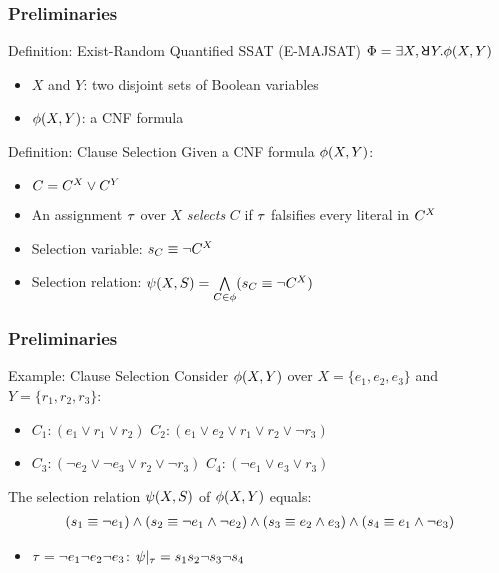 \begin{frame}
    \frametitle{Preliminaries}
    \begin{block}{Definition: Exist-Random Quantified SSAT (E-MAJSAT)}
        $\Qf=\exists X,\random{} Y.\pf(X,Y)$
        \pause
        \begin{itemize}
            \item $X$ and $Y$: two disjoint sets of Boolean variables
                  \pause
            \item $\phi(X,Y)$: a CNF formula
                  \pause
        \end{itemize}
    \end{block}
    \begin{block}{Definition: Clause Selection}
        Given a CNF formula $\phi(X,Y)$:
        \pause
        \begin{itemize}
            \item $C=C^X\lor C^Y$
                  \pause
            \item An assignment $\tau$ over $X$ \textit{selects} $C$ if $\tau$ falsifies every literal in $C^X$
                  \pause
            \item Selection variable: $s_{C}\equiv\lnot C^X$
                  \pause
            \item Selection relation: $\psi(X,S)=\bigwedge\limits_{C\in\phi}(s_{C}\equiv\lnot C^X)$
        \end{itemize}
    \end{block}
\end{frame}

\begin{frame}
    \frametitle{Preliminaries}
    \begin{block}{Example: Clause Selection}
        Consider $\phi(X,Y)$ over $X=\{e_1,e_2,e_3\}$ and $Y=\{r_1,r_2,r_3\}$:
        \begin{itemize}
            \item[] $C_1: (e_1 \lor r_1 \lor r_2)$ $C_2: (e_1 \lor e_2 \lor r_1 \lor r_2 \lor \lnot r_3)$
            \item[] $C_3: (\lnot e_2 \lor \lnot e_3 \lor r_2 \lor \lnot r_3)$ $C_4: (\lnot e_1 \lor e_3 \lor r_3)$
        \end{itemize}
        \pause
        The selection relation $\psi(X,S)$ of $\phi(X,Y)$ equals:
        \belowdisplayskip=0pt
        \begin{align*}
            (s_{1} \equiv \lnot e_1) \land
            (s_{2} \equiv \lnot e_1 \land \lnot e_2) \land
            (s_{3} \equiv e_2 \land e_3) \land
            (s_{4} \equiv e_1 \land \lnot e_3)
        \end{align*}
        \pause
        \begin{itemize}
            \item $\tau=\lnot e_1 \lnot e_2 \lnot e_3$: $\psi|_{\tau}=s_1s_2\neg s_3 \neg s_4$
        \end{itemize}
    \end{block}
\end{frame}